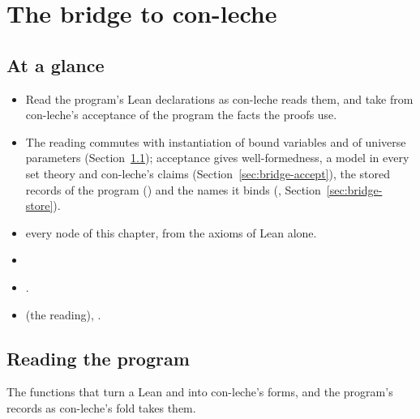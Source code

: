 \chapter{The bridge to con-leche}\label{chap:bridge}

\section*{At a glance}
\begin{itemize}
\item {} Read the program's Lean declarations as con-leche reads them, and take from
  con-leche's acceptance of the program the facts the proofs use.
\item {} The reading commutes with instantiation of bound variables and of universe
  parameters (Section~\ref{sec:bridge-reading}); acceptance gives well-formedness, a model in every
  set theory and con-leche's claims (Section~\ref{sec:bridge-accept}), the stored records of the program () and the names it binds (, Section~\ref{sec:bridge-store}).
\item {} \stProved{} every node of this chapter, from the axioms of Lean alone.
\item {} 
\item {} .
\item {}  (the reading), .
\end{itemize}

\section{Reading the program}\label{sec:bridge-reading}

The functions that turn a Lean  and  into con-leche's forms, and the
program's records as con-leche's fold takes them.

